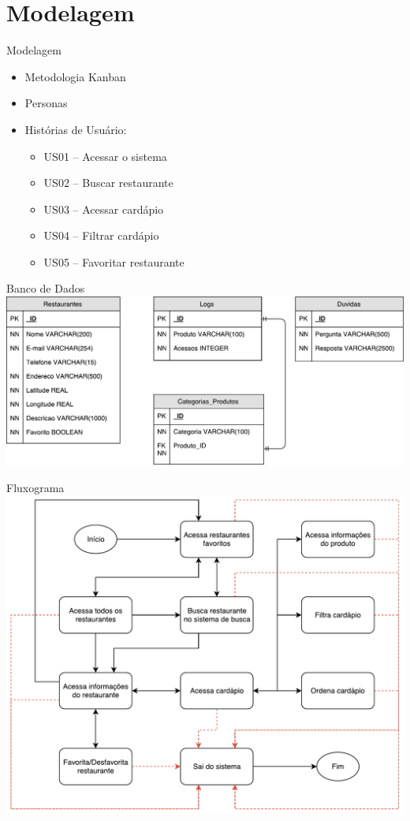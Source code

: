 \section{Modelagem}\label{sec:modelagem}
\begin{frame}[allowframebreaks]{Modelagem}
	\begin{itemize}
		\setlength{\itemsep}{0.5em}
		\item<1-> Metodologia Kanban
		\item<1-> Personas
		\item<1-> Histórias de Usuário:
		\begin{itemize}
			\setlength{\itemsep}{0.5em}
			\item<1-> US01 -- Acessar o sistema
			\item<1-> US02 -- Buscar restaurante
			\item<1-> US03 -- Acessar cardápio
			\item<1-> US04 -- Filtrar cardápio
			\item<1-> US05 -- Favoritar restaurante
		\end{itemize}
	\end{itemize}
\end{frame}

\begin{frame}[allowframebreaks]{Banco de Dados}
	\centering
	\includegraphics[width=1\linewidth]{../pdf/bd-slides.pdf}
\end{frame}

\begin{frame}{Fluxograma}
	\centering
	\includegraphics[width=0.8\linewidth]{../pdf/fluxograma-atual.pdf}
\end{frame}